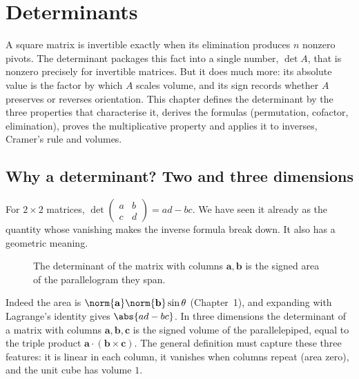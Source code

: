 \chapter{Determinants}

A square matrix is invertible exactly when its elimination produces $n$ nonzero pivots. The determinant packages this fact into a single number, $\det A$, that is nonzero precisely for invertible matrices. But it does much more: its absolute value is the factor by which $A$ scales volume, and its sign records whether $A$ preserves or reverses orientation. This chapter defines the determinant by the three properties that characterise it, derives the formulas (permutation, cofactor, elimination), proves the multiplicative property and applies it to inverses, Cramer's rule and volumes.

\section{Why a determinant? Two and three dimensions}

For $2\times2$ matrices, $\det\begin{pmatrix}a&b\\c&d\end{pmatrix}=ad-bc$. We have seen it already as the quantity whose vanishing makes the inverse formula break down. It also has a geometric meaning.

\begin{figure}[h]
\centering
{}
\caption{The determinant of the matrix with columns $\mathbf{a},\mathbf{b}$ is the signed area of the parallelogram they span.}
\end{figure}

Indeed the area is $\norm{\mathbf{a}}\norm{\mathbf{b}}\sin\theta$ (Chapter~1), and expanding with Lagrange's identity gives $\abs{ad-bc}$. In three dimensions the determinant of a matrix with columns $\mathbf{a},\mathbf{b},\mathbf{c}$ is the signed volume of the parallelepiped, equal to the triple product $\mathbf{a}\cdot(\mathbf{b}\times\mathbf{c})$. The general definition must capture these three features: it is linear in each column, it vanishes when columns repeat (area zero), and the unit cube has volume $1$.

